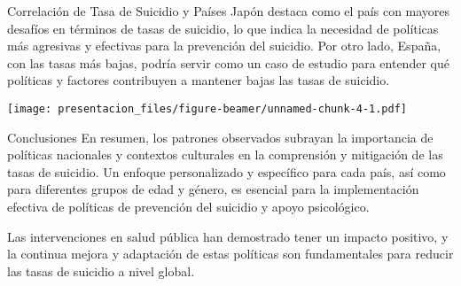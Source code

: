 \documentclass[
  ignorenonframetext,
]{beamer}
\begin{document}
\begin{frame}{Correlación de Tasa de Suicidio y Países}
\protect\hypertarget{correlaciuxf3n-de-tasa-de-suicidio-y-pauxedses}{}
Japón destaca como el país con mayores desafíos en términos de tasas de
suicidio, lo que indica la necesidad de políticas más agresivas y
efectivas para la prevención del suicidio. Por otro lado, España, con
las tasas más bajas, podría servir como un caso de estudio para entender
qué políticas y factores contribuyen a mantener bajas las tasas de
suicidio.

\texttt{[image: presentacion\_files/figure-beamer/unnamed-chunk-4-1.pdf]}
\end{frame}

\begin{frame}{Conclusiones}
\protect\hypertarget{conclusiones}{}
En resumen, los patrones observados subrayan la importancia de políticas
nacionales y contextos culturales en la comprensión y mitigación de las
tasas de suicidio. Un enfoque personalizado y específico para cada país,
así como para diferentes grupos de edad y género, es esencial para la
implementación efectiva de políticas de prevención del suicidio y apoyo
psicológico.

Las intervenciones en salud pública han demostrado tener un impacto
positivo, y la continua mejora y adaptación de estas políticas son
fundamentales para reducir las tasas de suicidio a nivel global.
\end{frame}
\end{document}
